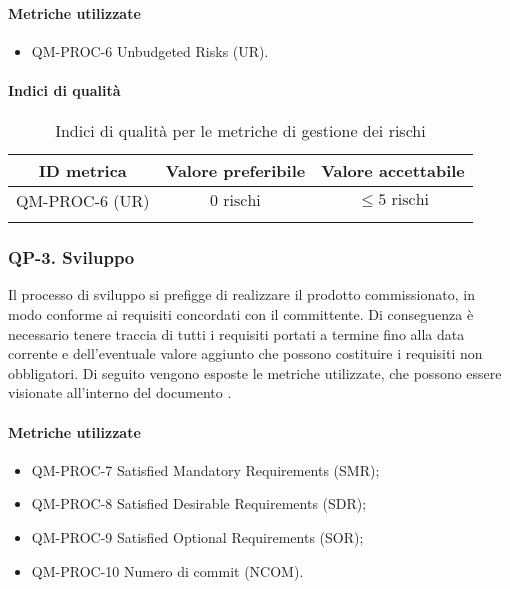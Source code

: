 		\paragraph{Metriche utilizzate}

			\begin{itemize}
				\item QM-PROC-6 Unbudgeted Risks (UR).
			\end{itemize}

		\paragraph{Indici di qualità}

			\begin{center}
				\begin{longtable}{|c|c|c|}
				\hline
				\rowcolor{lighter-grayer}
				\textbf{ID metrica} & \textbf{Valore preferibile} & \textbf{Valore accettabile}\\
				\hline
				\endfirsthead
				\hline
				QM-PROC-6 (UR) & \(0 \text{ rischi}\) & \(\le 5 \text{ rischi}\) \\
				\hline
				\caption{Indici di qualità per le metriche di gestione dei rischi}
				\end{longtable}
			\end{center}

	\subsubsection{QP-3. Sviluppo}

		Il processo di sviluppo si prefigge di realizzare il prodotto commissionato, in modo conforme ai requisiti concordati con il committente.
		\newline
		Di conseguenza è necessario tenere traccia di tutti i requisiti portati a termine fino alla data corrente e dell'eventuale valore aggiunto che possono costituire i requisiti non obbligatori.
		\newline
		Di seguito vengono esposte le metriche utilizzate, che possono essere visionate all'interno del documento .

		\paragraph{Metriche utilizzate}

			\begin{itemize}
				\item QM-PROC-7 Satisfied Mandatory Requirements (SMR);
				\item QM-PROC-8 Satisfied Desirable Requirements (SDR);
				\item QM-PROC-9 Satisfied Optional Requirements (SOR);
				\item QM-PROC-10 Numero di commit (NCOM).
			\end{itemize}


